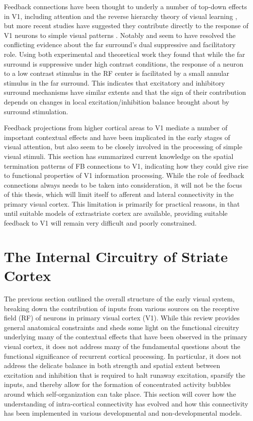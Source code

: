 Feedback connections have been thought to underly a number of top-down
effects in V1, including attention \citep{Treue2003} and the reverse
hierarchy theory of visual learning \citep{Ahissar2004}, but more
recent studies have suggested they contribute directly to the response
of V1 neurons to simple visual patterns
\citep{Angelucci2002,Angelucci2003,Schwabe2006}. Notably
\cite{Schwabe2006} and \cite{Ichida2007} seem to have resolved the
conflicting evidence about the far surround's dual suppressive and
facilitatory role. Using both experimental and theoretical work they
found that while the far surround is suppressive under high contrast
conditions, the response of a neuron to a low contrast stimulus in the
RF center is facilitated by a small annular stimulus in the far
surround. This indicates that excitatory and inhibitory surround
mechanisms have similar extents and that the sign of their
contribution depends on changes in local excitation/inhibition balance
brought about by surround stimulation.

Feedback projections from higher cortical areas to V1 mediate a number
of important contextual effects and have been implicated in the early
stages of visual attention, but also seem to be closely involved in the
processing of simple visual stimuli. This section has summarized
current knowledge on the spatial termination patterns of FB
connections to V1, indicating how they could give rise to functional
properties of V1 information processing. While the role of feedback
connections always needs to be taken into consideration, it will not be the
focus of this thesis, which will limit itself to afferent and lateral
connectivity in the primary visual cortex.  This limitation is
primarily for practical reasons, in that until suitable models of
extrastriate cortex are available, providing suitable feedback to V1
will remain very difficult and poorly constrained.

\section{The Internal Circuitry of Striate Cortex}

The previous section outlined the overall structure of the early visual
system, breaking down the contribution of inputs from various sources
on the receptive field (RF) of neurons in primary visual cortex
(V1). While this review provides general anatomical constraints and sheds
some light on the functional circuitry underlying many of the
contextual effects that have been observed in the primary visual
cortex, it does not address many of the fundamental questions about
the functional significance of recurrent cortical processing. In
particular, it does not address the delicate balance in both strength
and spatial extent between excitation and inhibition that is required
to halt runaway excitation, sparsify the inputs, and thereby allow for
the formation of concentrated activity bubbles around which
self-organization can take place. This section will cover how the
understanding of intra-cortical connectivity has evolved and how this
connectivity has been implemented in various developmental and
non-developmental models.

